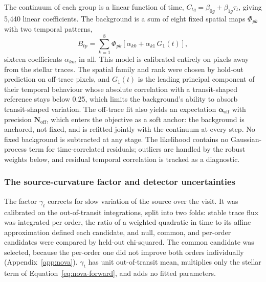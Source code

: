 The continuum of each group is a linear function of time,
$C_{tg}=\beta_{0g}+\beta_{1g}\tau_t$, giving 5{,}440 linear coefficients.
The background is a sum of eight fixed spatial maps $\Phi_{pk}$ with two
temporal patterns,
\begin{equation}
 B_{tp}=\sum_{k=1}^{8}\Phi_{pk}
 \left[\alpha_{k0}+\alpha_{k1}\,G_1(t)\right],
 \label{eq:background-model}
\end{equation}
sixteen coefficients $\alpha_{km}$ in all. This model is calibrated
entirely on pixels away from the stellar traces. The spatial family and
rank were chosen by hold-out prediction on off-trace pixels, and $G_1(t)$
is the leading principal component of their temporal behaviour whose
absolute correlation with a transit-shaped reference stays below 0.25,
which limits the background's ability to absorb transit-shaped
variation. The off-trace fit also yields
an expectation $\bm{\alpha}_{\mathrm{off}}$ with precision
$\bm{N}_{\mathrm{off}}$, which enters the objective as a soft anchor: the
background is anchored, not fixed, and is refitted jointly with the
continuum at every step. No fixed background is subtracted at any stage.
The likelihood contains no Gaussian-process term for time-correlated
residuals; outliers are handled by the robust weights below, and residual
temporal correlation is tracked as a diagnostic.

\subsubsection{The source-curvature factor and detector uncertainties}


The factor $\gamma_t$ corrects for slow variation of the source over the
visit. It was calibrated on the out-of-transit integrations, split into
two folds: stable trace flux was integrated per order, the ratio of a
weighted quadratic in time to its affine approximation defined each
candidate, and null, common, and per-order candidates were compared by
held-out chi-squared. The common candidate was selected, because the
per-order one did not improve both orders individually
(Appendix~\ref{app:nova}). $\gamma_t$ has unit out-of-transit mean,
multiplies only the stellar term of Equation~\ref{eq:nova-forward}, and
adds no fitted parameters.

